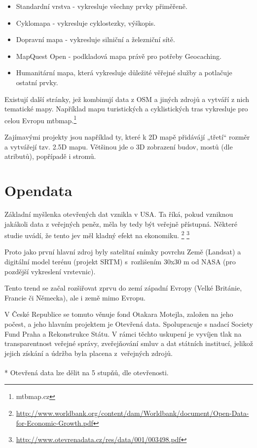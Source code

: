 \begin{itemize}
  \item Standardní vrstva - vykresluje všechny prvky přiměřeně.
  \item Cyklomapa - vykresluje cyklostezky, výškopis. 
  \item Dopravní mapa - vykresluje silniční a železniční sítě.
  \item MapQuest Open - podkladová mapa právě pro potřeby Geocaching.
  \item Humanitární mapa, která vykresluje důležité věřejné služby a potlačuje ostatní prvky. 
\end{itemize}

Existují další stránky, jež kombinují data z OSM a jiných zdrojů a vytváří z nich tematické mapy.
Například mapu turistických a cyklistických tras vykresluje
pro celou Evropu mtbmap.\footnote{mtbmap.cz}

Zajímavými projekty jsou například ty, které k 2D mapě přidávájí „třetí“ rozměr a
vytvářejí tzv. 2.5D mapu. Většinou jde o 3D zobrazení budov, mostů (dle
atributů), popřípadě i stromů.



\section{Opendata}
\label{opendata}

Základní myšlenka otevřených dat vznikla v USA.
Ta říká, pokud vzniknou jakákoli data z veřejných peněz, měla by tedy být
veřejně přístupná. Některé studie uvádí, že tento jev měl kladný efekt na ekonomiku.
\footnote{\url{http://www.worldbank.org/content/dam/Worldbank/document/Open-Data-for-Economic-Growth.pdf}}
\footnote{\url{http://www.otevrenadata.cz/res/data/001/003498.pdf}}

Proto jako první hlavní zdroj byly satelitní snímky povrchu Země (Landsat) %
a digitální model terénu (projekt SRTM) %
s~rozlišením 30x30 m od NASA (pro pozdější vykreslení vrstevnic).

Tento trend se začal rozšiřovat zprvu do zemí západní Evropy
(Velké Británie, Francie či Německa), ale i země mimo Evropu.\cite{OpendataTrends}

V České Republice se tomuto věnuje fond Otakara Motejla, založen na jeho počest,
a jeho hlavním projektem je Otevřená data. Spolupracuje s nadací Society Fund
Praha a Rekonstrukce Státu.
V rámci těchto uskupení je vyvíjen tlak na transparentnost veřejné správy,
zveřejňování smluv a dat státních institucí, jelikož jejich získání a údržba byla
placena z~veřejných zdrojů.
\\
\\*
Otevřená data lze dělit na 5 stupňů,
dle otevřenosti.

